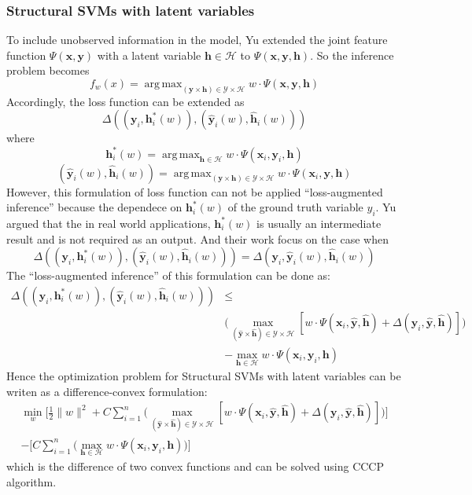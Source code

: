 \documentclass{article}
\DeclareMathOperator*{\argmax}{arg\,max}
\begin{document}
		\subsubsection{Structural SVMs with latent variables}
		To include unobserved information in the model, Yu\cite{yu2009learning} extended the joint feature function  $\Psi(\mathbf{x},\mathbf{y}) $ with a latent variable $\mathbf{h}\in \mathcal{H}$ to $\Psi(\mathbf{x},\mathbf{y},\mathbf{h}) $. So the inference problem becomes
		$$
		f_w(x) = \argmax_{(\mathbf{y} \times \mathbf{h}) \in \mathcal{Y} \times \mathcal{H}} w\cdot\Psi(\mathbf{x},\mathbf{y},\mathbf{h})
		$$
		Accordingly, the loss function can be extended as
		$$
		\Delta((\mathbf{y}_i,\mathbf{h}^*_i(w)),(\mathbf{\hat{y}}_i(w),\mathbf{\hat{h}}_i(w)))
		$$
		where
		$$
		\mathbf{h}^*_i(w) = \argmax_{\mathbf{h} \in \mathcal{H}} w \cdot \Psi(\mathbf{x}_i,\mathbf{y}_i,\mathbf{h})
		$$
		$$
		(\mathbf{\hat{y}}_i(w),\mathbf{\hat{h}}_i(w))=\argmax_{(\mathbf{y} \times \mathbf{h}) \in \mathcal{Y} \times \mathcal{H}} w\cdot\Psi(\mathbf{x}_i,\mathbf{y},\mathbf{h})
		$$
		However, this formulation of loss function can not be applied ``loss-augmented inference'' because the dependece on $\mathbf{h}^*_i(w)$ of the ground truth variable $y_i$.  Yu\cite{yu2009learning} argued that the in real world applications, $\mathbf{h}^*_i(w)$ is usually an intermediate result and is not required as an output. And their work focus on the case when
		$$
		\Delta((\mathbf{y}_i,\mathbf{h}^*_i(w)),(\mathbf{\hat{y}}_i(w),\mathbf{\hat{h}}_i(w)))=\Delta(\mathbf{y}_i,\mathbf{\hat{y}}_i(w),\mathbf{\hat{h}}_i(w))
		$$
		The ``loss-augmented inference'' of this formulation can be done as:
		\begin{align*}
			\Delta((\mathbf{y}_i,\mathbf{h}^*_i(w)),(\mathbf{\hat{y}}_i(w),\mathbf{\hat{h}}_i(w)))
			&\leq\\
			&\bigg(\max_{(\mathbf{\hat{y}} \times \mathbf{\hat{h}}) \in \mathcal{Y} \times \mathcal{H}} [w\cdot\Psi(\mathbf{x}_i,\mathbf{\hat{y}},\mathbf{\hat{h}}) + \Delta(\mathbf{y}_i,\mathbf{\hat{y}},\mathbf{\hat{h}})]\bigg)\\
			&-\max_{\mathbf{h} \in \mathcal{H}} w \cdot \Psi(\mathbf{x}_i,\mathbf{y}_i,\mathbf{h})
		\end{align*}
		Hence the optimization problem for Structural SVMs with latent variables can be writen as a difference-convex formulation:
		\begin{align*}
			\min_w\bigg[\frac{1}{2}\|w\|^2+
			C\sum_{i=1}^{n}\big(\max_{(\mathbf{\hat{y}} \times \mathbf{\hat{h}}) \in \mathcal{Y} \times \mathcal{H}} [w\cdot\Psi(\mathbf{x}_i,\mathbf{\hat{y}},\mathbf{\hat{h}}) + \Delta(\mathbf{y}_i,\mathbf{\hat{y}},\mathbf{\hat{h}})]\big)\bigg]\\
			-\bigg[C\sum_{i=1}^{n}\big(\max_{\mathbf{h} \in \mathcal{H}} w \cdot \Psi(\mathbf{x}_i,\mathbf{y}_i,\mathbf{h})\big)\bigg]
		\end{align*}
		which is the difference of two convex functions and can be solved using CCCP\cite{yuille2002concave} algorithm.
\end{document}
